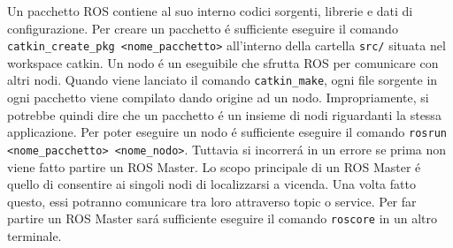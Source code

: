 Un pacchetto ROS contiene al suo interno codici sorgenti, librerie e dati di configurazione.
Per creare un pacchetto \'{e} sufficiente eseguire il comando \\
\verb|catkin_create_pkg <nome_pacchetto>| all'interno della cartella \verb|src/| situata nel workspace catkin.
Un nodo \'{e} un eseguibile che sfrutta ROS per comunicare con altri nodi.
Quando viene lanciato il comando \verb|catkin_make|, ogni file sorgente in ogni pacchetto viene compilato 
dando origine ad un nodo.
Impropriamente, si potrebbe quindi dire che un pacchetto \'{e} un insieme di nodi riguardanti la stessa applicazione.
Per poter eseguire un nodo \'{e} sufficiente eseguire il comando \verb|rosrun <nome_pacchetto> <nome_nodo>|.
Tuttavia si incorrer\'{a} in un errore se prima non viene fatto partire un ROS Master.
Lo scopo principale di un ROS Master \'{e} quello di consentire ai singoli nodi di localizzarsi a vicenda. Una volta 
fatto questo, essi potranno comunicare tra loro attraverso topic o service.
Per far partire un ROS Master sar\'{a} sufficiente eseguire il comando \verb|roscore| in un altro terminale.
